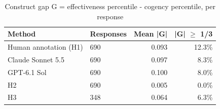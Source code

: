 \begin{table}[htbp]
\centering
\small
\caption{Construct gap G = effectiveness percentile - cogency percentile, per response}
\label{tab:X6_construct_gap}
\begin{tabular}{llrr}
\toprule
Method & Responses & Mean |G| & |G| $\geq$ 1/3 \\
\midrule
Human annotation (H1) & 690 & 0.093 & 12.3\% \\
Claude Sonnet 5.5 & 690 & 0.097 & 8.3\% \\
GPT-6.1 Sol & 690 & 0.100 & 8.0\% \\
H2 & 690 & 0.005 & 0.0\% \\
H3 & 348 & 0.064 & 6.3\% \\
\bottomrule
\end{tabular}
\end{table}
